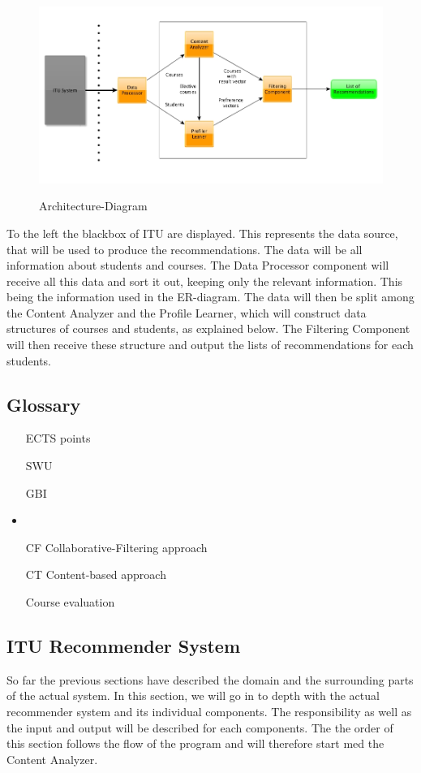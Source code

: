 \begin{figure}[H]
\centering
\includegraphics[scale=0.5]{Pictures/Architecture-Diagram.jpg}
\label{Architecture-Diagram}
\caption{Architecture-Diagram}
\end{figure}


To the left the blackbox of ITU are displayed. This represents the data source, that will be used to produce the recommendations. The data will be all information about students and courses. The Data Processor component will receive all this data and sort it out, keeping only the relevant information. This being the information used in the ER-diagram. The data will then be split among the Content Analyzer and the Profile Learner, which will construct data structures of courses and students, as explained below. The Filtering Component will then receive these structure and output the lists of recommendations for each students. 


\subsection{Glossary}
\begin{itemize}
	\item[ECTS points] 
	\item[SWU]
	\item[GBI]
	\item {}
	\item[CF] Collaborative-Filtering approach
	\item[CT] Content-based approach
	\item[Course evaluation]
\end{itemize}
\subsection{ITU Recommender System}
So far the previous sections have described the domain and the surrounding parts of the actual system. In this section, we will go in to depth with the actual recommender system and its individual components. The responsibility as well as the input and output will be described for each components. The the order of this section follows the flow of the program and will therefore start med the Content Analyzer.
